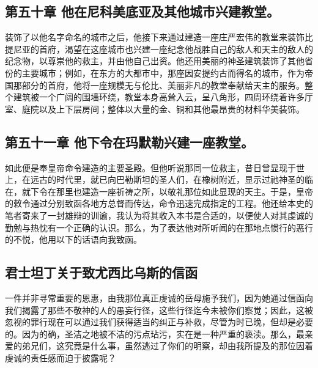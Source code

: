 
\subsection{第五十章 他在尼科美底亚及其他城市兴建教堂。}

装饰了以他名字命名的城市之后，他接下来通过建造一座庄严宏伟的教堂来装饰比提尼亚的首府，渴望在这座城市也兴建一座纪念他战胜自己的敌人和天主的敌人的纪念物，以尊崇他的救主，并由他自己出资。他还用美丽的神圣建筑装饰了其他省份的主要城市；例如，在东方的大都市中，那座因安提约古而得名的城市，作为帝国那部分的首府，他将一座规模无与伦比、美丽非凡的教堂奉献给天主的服务。整个建筑被一个广阔的围墙环绕，教堂本身高耸入云，呈八角形，四周环绕着许多厅室、庭院以及上下层房间；整体以大量的金、铜和其他最昂贵的材料华美装饰。\par


\subsection{第五十一章 他下令在玛默勒兴建一座教堂。}

如此便是奉皇帝命令建造的主要圣殿。但他听说那同一位救主，昔日曾显现于世上，在远古的时代里，就已向巴勒斯坦的圣人们，在橡树附近，显示过祂神圣的临在，就下令在那里也建造一座祈祷之所，以敬礼那位如此显现的天主。于是，皇帝的敕令通过分别致函各地方总督而传达，命令迅速完成指定的工程。他还给本史的笔者寄来了一封雄辩的训谕，我认为将其收入本书是合适的，以便使人对其虔诚的勤勉与热忱有一个正确的认识。那么，为了表达他对所听闻的在那地点惯行的恶行的不悦，他用以下的话语向我致函。\par


\subsection{君士坦丁关于致尤西比乌斯的信函}

\par

一件并非寻常重要的恩惠，由我那位真正虔诚的岳母施予我们，因为她通过信函向我们揭露了那些不敬神的人的愚妄行径，这些行径迄今未被你们察觉；因此，这被忽视的罪行现在可以通过我们获得适当的纠正与补救，尽管为时已晚，但却是必要的。因为的确，圣洁之地被不洁的污点玷污，实在是一种严重的亵渎。那么，最亲爱的弟兄们，这究竟是什么事，虽然逃过了你们的明察，却由我所提及的那位因着虔诚的责任感而迫于披露呢？\par

